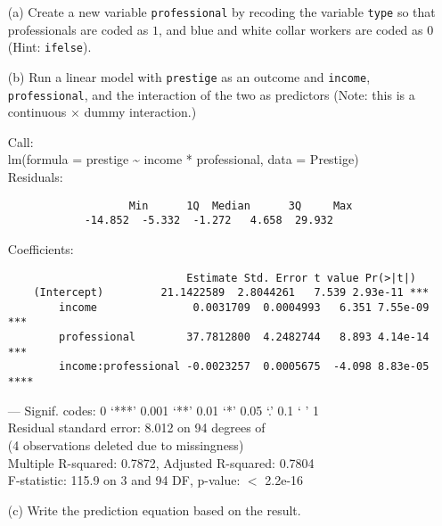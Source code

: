 \documentclass[12pt,letterpaper]{article}
\begin{document}
\newpage
\begin{enumerate}
	
	\item [(a)]
	Create a new variable \texttt{professional} by recoding the variable \texttt{type} so that professionals are coded as $1$, and blue and white collar workers are coded as $0$ (Hint: \texttt{ifelse}).
				 
	\vspace{6cm}
	
	
	\item [(b)]
	Run a linear model with \texttt{prestige} as an outcome and \texttt{income}, \texttt{professional}, and the interaction of the two as predictors (Note: this is a continuous $\times$ dummy interaction.)
					 
					
					Call:\\
					lm(formula = prestige \~{} income * professional, data = Prestige)\\
					Residuals:
					
					\begin{verbatim}
                   Min      1Q  Median      3Q     Max 
            -14.852  -5.332  -1.272   4.658  29.932 
					\end{verbatim}
					Coefficients:
					
					\begin{verbatim}
	                        Estimate Std. Error t value Pr(>|t|)    
 	(Intercept)         21.1422589  2.8044261   7.539 2.93e-11 ***
		income               0.0031709  0.0004993   6.351 7.55e-09 ***
		professional        37.7812800  4.2482744   8.893 4.14e-14 ***
		income:professional -0.0023257  0.0005675  -4.098 8.83e-05 ****
					\end{verbatim}
					---
					Signif. codes:  0 ‘***’ 0.001 ‘**’ 0.01 ‘*’ 0.05 ‘.’ 0.1 ‘ ’ 1\\
					
					Residual standard error: 8.012 on 94 degrees of \\
					(4 observations deleted due to missingness)\\
					Multiple R-squared:  0.7872,	Adjusted R-squared:  0.7804 \\
					F-statistic: 115.9 on 3 and 94 DF,  p-value: $<$ 2.2e-16\\
	\vspace{6cm}
	\item [(c)]
	Write the prediction equation based on the result.
	

\end{enumerate}
\end{document}

